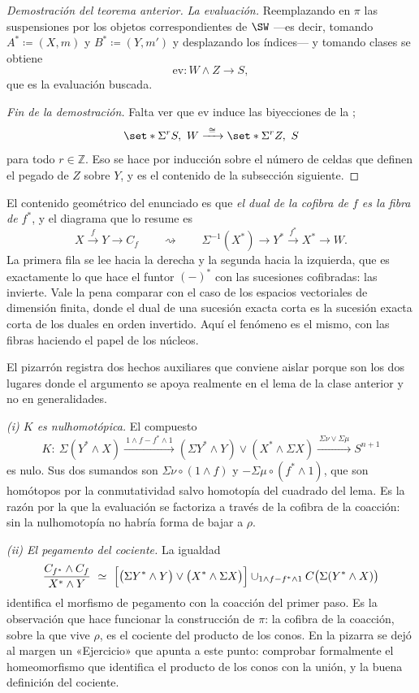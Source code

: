 \begin{proof}[Demostración del teorema anterior]
\emph{La evaluación.} Reemplazando en $\pi$ las suspensiones por los objetos correspondientes de $\SW$ ---es decir, tomando $A^*\coloneqq(X,m)$ y $B^*\coloneqq(Y,m')$ y desplazando los índices--- y tomando clases se obtiene
\[
\mathrm{ev}\colon W\wedge Z\longrightarrow S ,
\]
que es la evaluación buscada.

\emph{Fin de la demostración.} Falta ver que $\mathrm{ev}$ induce las biyecciones de la ;
\[
\set*{\Sigma^rS,\ W}\xrightarrow{\ \cong\ }\set*{\Sigma^rZ,\ S}
\]
para todo $r\in\mathbb Z$. Eso se hace por inducción sobre el número de celdas que definen el pegado de $Z$ sobre $Y$, y es el contenido de la subsección siguiente. \qedhere
\end{proof}

\begin{nota}
   El contenido geométrico del enunciado es que \emph{el dual de la cofibra de $f$ es la fibra de $f^*$}, y el diagrama que lo resume es
   \[
   X\xrightarrow{\ f\ }Y\longrightarrow C_f
   \qquad\rightsquigarrow\qquad
   \Sigma^{-1}(X^*)\longrightarrow Y^*\xrightarrow{\ f^*\ }X^*\longrightarrow W .
   \]
   La primera fila se lee hacia la derecha y la segunda hacia la izquierda, que es exactamente lo que hace el funtor $(-)^*$ con las sucesiones cofibradas: las invierte. Vale la pena comparar con el caso de los espacios vectoriales de dimensión finita, donde el dual de una sucesión exacta corta es la sucesión exacta corta de los duales en orden invertido. Aquí el fenómeno es el mismo, con las fibras haciendo el papel de los núcleos.
\end{nota}

\begin{nota}
   El pizarrón registra dos hechos auxiliares que conviene aislar porque son los dos lugares donde el argumento se apoya realmente en el lema de la clase anterior y no en generalidades.

   \emph{(i) $K$ es nulhomotópica.} El compuesto
   \[
   K\colon\ \Sigma(Y^*\wedge X)\xrightarrow{\ 1\wedge f-f^*\wedge1\ }(\Sigma Y^*\wedge Y)\vee(X^*\wedge\Sigma X)\xrightarrow{\ \Sigma\nu\vee\Sigma\mu\ }S^{n+1}
   \]
   es nulo. Sus dos sumandos son $\Sigma\nu\circ(1\wedge f)$ y $-\Sigma\mu\circ(f^*\wedge1)$, que son homótopos por la conmutatividad salvo homotopía del cuadrado del lema. Es la razón por la que la evaluación se factoriza a través de la cofibra de la coacción: sin la nulhomotopía no habría forma de bajar a $\rho$.

   \emph{(ii) El pegamento del cociente.} La igualdad
   \[
   \frac{C_{f^*}\wedge C_f}{X^*\wedge Y}\ \simeq\ \Bigl[\bigl(\Sigma Y^*\wedge Y\bigr)\vee\bigl(X^*\wedge\Sigma X\bigr)\Bigr]\cup_{1\wedge f-f^*\wedge1}C\bigl(\Sigma(Y^*\wedge X)\bigr)
   \]
   identifica el morfismo de pegamento con la coacción del primer paso. Es la observación que hace funcionar la construcción de $\pi$: la cofibra de la coacción, sobre la que vive $\rho$, es el cociente del producto de los conos. En la pizarra se dejó al margen un «Ejercicio» que apunta a este punto: comprobar formalmente el homeomorfismo que identifica el producto de los conos con la unión, y la buena definición del cociente.
\end{nota}

